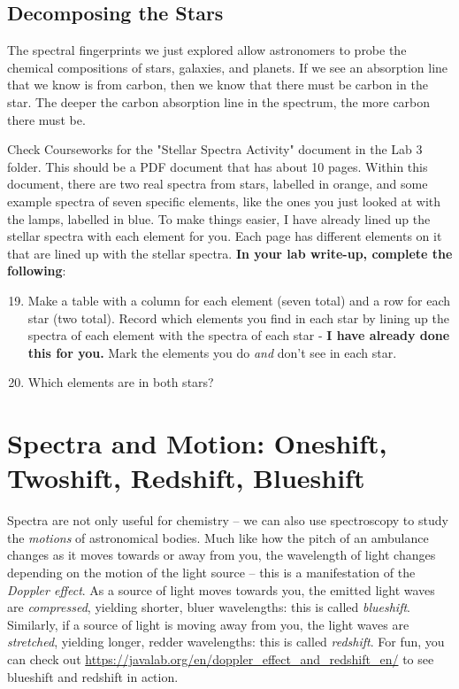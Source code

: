 \documentclass[11pt]{article}
\begin{document}
\subsection{Decomposing the Stars}
The spectral fingerprints we just explored allow astronomers to probe the chemical compositions of stars, galaxies, and planets. If we see an absorption line that we know is from carbon, then we know that there must be carbon in the star. The deeper the carbon absorption line in the spectrum, the more carbon there must be.

\medskip \noindent
Check Courseworks for the "Stellar Spectra Activity" document in the Lab 3 folder. This should be a PDF document that has about 10 pages. Within this document, there are two real spectra from stars, labelled in orange, and some example spectra of seven specific elements, like the ones you just looked at with the lamps, labelled in blue. To make things easier, I have already lined up the stellar spectra with each element for you. Each page has different elements on it that are lined up with the stellar spectra. \textbf{In your lab write-up, complete the following}:
\begin{enumerate}
    \setcounter{enumi}{18}
    
    \item Make a table with a column for each element (seven total) and a row for each star (two total). Record which elements you find in each star by lining up the spectra of each element with the spectra of each star - \textbf{I have already done this for you.} Mark the elements you do \textit{and} don't see in each star.
    
    \item Which elements are in both stars?
    
\end{enumerate}


\section{Spectra and Motion: Oneshift, Twoshift, Redshift, Blueshift}

Spectra are not only useful for chemistry -- we can also use spectroscopy to study the \emph{motions} of astronomical bodies. Much like how the pitch of an ambulance changes as it moves towards or away from you, the wavelength of light changes depending on the motion of the light source -- this is a manifestation of the \emph{Doppler effect}. As a source of light moves towards you, the emitted light waves are \emph{compressed}, yielding shorter, bluer wavelengths: this is called \emph{blueshift}. Similarly, if a source of light is moving away from you, the light waves are \emph{stretched}, yielding longer, redder wavelengths: this is called \emph{redshift}. For fun, you can check out \url{https://javalab.org/en/doppler_effect_and_redshift_en/} to see blueshift and redshift in action. 
\end{document}
